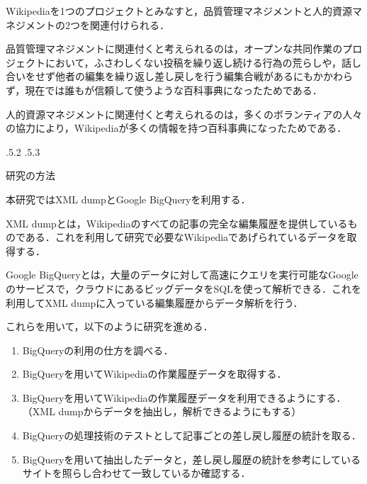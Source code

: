 \documentclass[uplatex]{jsarticle}
\makeatletter
\renewcommand{\section}{%
    \if@slide\clearpage\fi
    \@startsection{section}{1}{\z@}%
    {\Cvs \@plus.5\Cdp \@minus.2\Cdp}%
    {.5\Cvs \@plus.3\Cdp}%
    {\normalfont\raggedright}}
\makeatother
\begin{document}
Wikipediaを1つのプロジェクトとみなすと，品質管理マネジメントと人的資源マネジメントの2つを関連付けられる\cite{test8}．

品質管理マネジメントに関連付くと考えられるのは，オープンな共同作業のプロジェクトにおいて，ふさわしくない投稿を繰り返し続ける行為の荒らしや，話し合いをせず他者の編集を繰り返し差し戻しを行う編集合戦があるにもかかわらず，現在では誰もが信頼して使うような百科事典になったためである．

人的資源マネジメントに関連付くと考えられるのは，多くのボランティアの人々の協力により，Wikipediaが多くの情報を持つ百科事典になったためである．






\section{研究の方法}

本研究ではXML dump\cite{test105}とGoogle BigQuery\cite{test104}を利用する．

XML dumpとは，Wikipediaのすべての記事の完全な編集履歴を提供しているものである．これを利用して研究で必要なWikipediaであげられているデータを取得する．

Google BigQueryとは，大量のデータに対して高速にクエリを実行可能なGoogleのサービスで，クラウドにあるビッグデータをSQLを使って解析できる．これを利用してXML dumpに入っている編集履歴からデータ解析を行う．

これらを用いて，以下のように研究を進める．

\begin{enumerate}
\item BigQueryの利用の仕方を調べる\cite{test102}．

\item BigQueryを用いてWikipediaの作業履歴データを取得する．

\item BigQueryを用いてWikipediaの作業履歴データを利用できるようにする．（XML dumpからデータを抽出し，解析できるようにもする）

\item BigQueryの処理技術のテストとして記事ごとの差し戻し履歴の統計を取る．

\item BigQueryを用いて抽出したデータと，差し戻し履歴の統計を参考にしているサイト\cite{test103}を照らし合わせて一致しているか確認する．
\end{enumerate}
\end{document}
